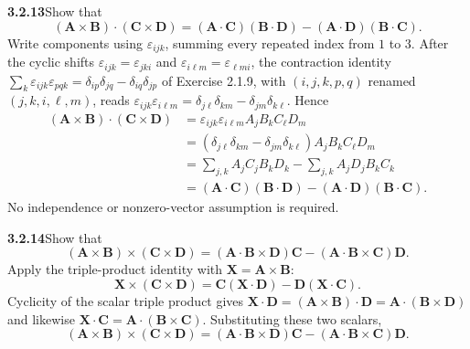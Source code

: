 \par\bigskip
\noindent\textbf{3.2.13}\quad Show that
\[
(\mathbf{A}\times\mathbf{B})\cdot(\mathbf{C}\times\mathbf{D})
=(\mathbf{A}\cdot\mathbf{C})(\mathbf{B}\cdot\mathbf{D})
-(\mathbf{A}\cdot\mathbf{D})(\mathbf{B}\cdot\mathbf{C}).
\]
\solution
Write components using $\varepsilon_{ijk}$, summing every repeated
index from $1$ to $3$. After the cyclic shifts
$\varepsilon_{ijk}=\varepsilon_{jki}$ and
$\varepsilon_{i\ell m}=\varepsilon_{\ell mi}$, the contraction identity
$\sum_k\varepsilon_{ijk}\varepsilon_{pqk}
=\delta_{ip}\delta_{jq}-\delta_{iq}\delta_{jp}$ of Exercise 2.1.9, with
$(i,j,k,p,q)$ renamed $(j,k,i,\ell,m)$, reads
$\varepsilon_{ijk}\varepsilon_{i\ell m}
=\delta_{j\ell}\delta_{km}-\delta_{jm}\delta_{k\ell}$. Hence
\[
\begin{aligned}
(\mathbf A\times\mathbf B)\cdot(\mathbf C\times\mathbf D)
&=\varepsilon_{ijk}\varepsilon_{i\ell m}A_jB_kC_\ell D_m\\
&=(\delta_{j\ell}\delta_{km}-\delta_{jm}\delta_{k\ell})
A_jB_kC_\ell D_m\\
&=\sum_{j,k}A_jC_jB_kD_k-\sum_{j,k}A_jD_jB_kC_k\\
&=(\mathbf A\cdot\mathbf C)(\mathbf B\cdot\mathbf D)
-(\mathbf A\cdot\mathbf D)(\mathbf B\cdot\mathbf C).
\end{aligned}
\]
No independence or nonzero-vector assumption is required.

\par\bigskip
\noindent\textbf{3.2.14}\quad Show that
\[
(\mathbf{A}\times\mathbf{B})\times(\mathbf{C}\times\mathbf{D})
=(\mathbf{A}\cdot\mathbf{B}\times\mathbf{D})\mathbf{C}
-(\mathbf{A}\cdot\mathbf{B}\times\mathbf{C})\mathbf{D}.
\]
\solution
Apply the triple-product identity with $\mathbf X=\mathbf A\times\mathbf B$:
\[
\mathbf X\times(\mathbf C\times\mathbf D)
=\mathbf C(\mathbf X\cdot\mathbf D)-\mathbf D(\mathbf X\cdot\mathbf C).
\]
Cyclicity of the scalar triple product gives
$\mathbf X\cdot\mathbf D=(\mathbf A\times\mathbf B)\cdot\mathbf D
=\mathbf A\cdot(\mathbf B\times\mathbf D)$ and likewise
$\mathbf X\cdot\mathbf C=\mathbf A\cdot(\mathbf B\times\mathbf C)$.
Substituting these two scalars,
\[
(\mathbf A\times\mathbf B)\times(\mathbf C\times\mathbf D)
=\boxed{(\mathbf A\cdot\mathbf B\times\mathbf D)\mathbf C
-(\mathbf A\cdot\mathbf B\times\mathbf C)\mathbf D}.
\]

